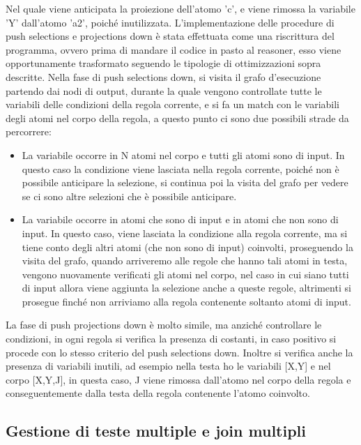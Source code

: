 Nel quale viene anticipata la proiezione dell'atomo 'c', e viene rimossa la variabile 'Y' dall'atomo 'a2', poiché inutilizzata. \newline \newline
L'implementazione delle procedure di push selections e projections down è stata effettuata come una riscrittura del programma, ovvero prima di mandare il codice in pasto al reasoner, esso viene opportunamente trasformato seguendo le tipologie di ottimizzazioni sopra descritte. \newline
Nella fase di push selections down, si visita il grafo d'esecuzione partendo dai nodi di output, durante la quale vengono controllate tutte le variabili delle condizioni della regola corrente, e si fa un match con le variabili degli atomi nel corpo della regola, a questo punto ci sono due possibili strade da percorrere: 
\begin{itemize}
	\item La variabile occorre in N atomi nel corpo e tutti gli atomi sono di input. In questo caso la condizione viene lasciata nella regola corrente, poiché non è possibile anticipare la selezione, si continua poi la visita del grafo per vedere se ci sono altre selezioni che è possibile anticipare.
	\item La variabile occorre in atomi che sono di input e in atomi che non sono di input. In questo caso, viene lasciata la condizione alla regola corrente, ma si tiene conto degli altri atomi (che non sono di input) coinvolti, proseguendo la visita del grafo, quando arriveremo alle regole che hanno tali atomi in testa, vengono nuovamente verificati gli atomi nel corpo, nel caso in cui siano tutti di input allora viene aggiunta la selezione anche a queste regole, altrimenti si prosegue finché non arriviamo alla regola contenente soltanto atomi di input.
\end{itemize}
La fase di push projections down è molto simile, ma anziché controllare le condizioni, in ogni regola si verifica la presenza di costanti, in caso positivo si procede con lo stesso criterio del push selections down. Inoltre si verifica anche la presenza di variabili inutili, ad esempio nella testa ho le variabili [X,Y] e nel corpo [X,Y,J], in questa caso, J viene rimossa dall'atomo nel corpo della regola e conseguentemente dalla testa della regola contenente l'atomo coinvolto.

\subsection{Gestione di teste multiple e join multipli}

